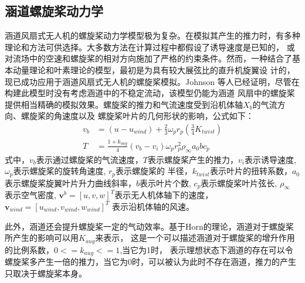 \subsection{涵道螺旋桨动力学}
涵道风扇式无人机的螺旋桨动力学模型极为复杂。在模拟其产生的推力时，有多种理论和方法可供选择。大多数方法在计算过程中都假设了诱导速度是已知的，
或对流场中的空速和螺旋桨的相对方向施加了严格的约束条件。然而，一种结合了基本动量理论和叶素理论的模型，最初是为具有较大展弦比的直升机旋翼设
计的，现已成功应用于涵道风扇式无人机的螺旋桨模拟。Johnson 等人已经证明，尽管在构建此模型时没有考虑涵道中的不稳定流动，该模型仍能为涵道
风扇中的螺旋桨提供相当精确的模拟效果\cite{johnson2006modeling}。螺旋桨的推力和气流速度受到沿机体轴$X_{b}$的气流方向、螺旋桨的角速度以及
螺旋桨叶片的几何形状的影响，公式如下\cite{choi2012static}：
\begin{align}
    v_{b} &= \left ( u-u_{wind} \right )  + \frac{2}{3}\omega_{p}r_{p}\left ( \frac{3}{4}K_{twist}\right )\\
    T &= \frac{1+k_{aug}}{4} \left ( v_{b}-v_{i}  \right )\omega _{p}r_{p}^{2}\rho _{\infty}a_{0}bc_{p}   
\end{align}
式中，$v_{b}$表示通过螺旋桨的气流速度，$T$表示螺旋桨产生的推力，$v_{i}$表示诱导速度, $\omega_{p}$表示螺旋桨的旋转角速度, $r_{p}$表示螺旋桨的
半径，$k_{twist}$表示叶片的扭转系数，$a_{0}$表示螺旋桨旋翼叶片升力曲线斜率，$b$表示叶片个数, $c_{p}$表示螺旋桨叶片弦长, $\rho _{\infty}$
表示空气密度, $\mathbf{v}^{b}=\left [ u,v,w \right ]^{T}$表示无人机体轴下的速度，$\mathbf{v}_{wind}=\left [ u_{wind},v_{wind},w_{wind} \right ]^{T}$
表示沿机体轴的风速。

此外，涵道还会提升螺旋桨一定的气动效率。基于Horn的理论\cite{myers2009aerodynamic}，涵道对于螺旋桨所产生的影响可以用$K_{aug}$来表示，
这是一个可以描述涵道对于螺旋桨的增升作用\cite{杜思亮2016轴流状态下涵道螺旋桨增升方法的数值模拟}的比例系数，$0<= k_{aug}<= 1$,当它为1时，
表示理想状态下涵道的存在可以令螺旋桨多产生一倍的推力，当它为0时，可以被认为此时不存在涵道，推力的产生只取决于螺旋桨本身。

